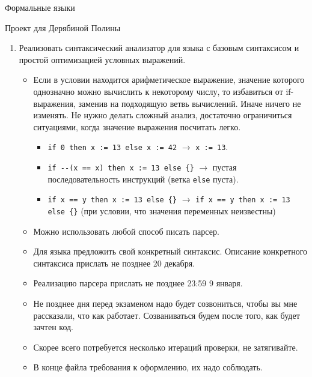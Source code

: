 \documentclass[12pt]{article}
\begin{document}
\begin{center}
{\LARGE Формальные языки}

{\Large Проект для Дерябиной Полины}

\end{center}

\bigskip

\begin{enumerate}
  \item {Реализовать синтаксический анализатор для языка с базовым синтаксисом и простой оптимизацией условных выражений. }
  \begin{itemize}
    \item Если в условии находится арифметическое выражение, значение которого однозначно можно вычислить к некоторому числу, то избавиться от if-выражения, заменив на подходящую ветвь вычислений. Иначе ничего не изменять. Не нужно делать сложный анализ, достаточно ограничиться ситуациями, когда значение выражения посчитать легко.
    \begin{itemize}
      \item \verb!if 0 then x := 13 else x := 42! $\to$ \verb!x := 13!.
      \item \verb!if --(x == x) then x := 13 else {}! $\to$ пустая последовательность инструкций (ветка \verb!else! пуста).
      \item \verb!if x == y then x := 13 else {}! $\to$ \verb!if x == y then x := 13 else {}! (при условии, что значения переменных неизвестны)
    \end{itemize}
    \item Можно использовать любой способ писать парсер.
    \item Для языка предложить свой конкретный синтаксис. Описание конкретного синтаксиса прислать не позднее 20 декабря.
    \item Реализацию парсера прислать не позднее 23:59 9 января.
    \item Не позднее дня перед экзаменом надо будет созвониться, чтобы вы мне рассказали, что как работает. Созваниваться будем после того, как будет зачтен код.
    \item Скорее всего потребуется несколько итераций проверки, не затягивайте.
    \item В конце файла требования к оформлению, их надо соблюдать.
  \end{itemize}

\end{enumerate}



\bigskip


\end{document}
